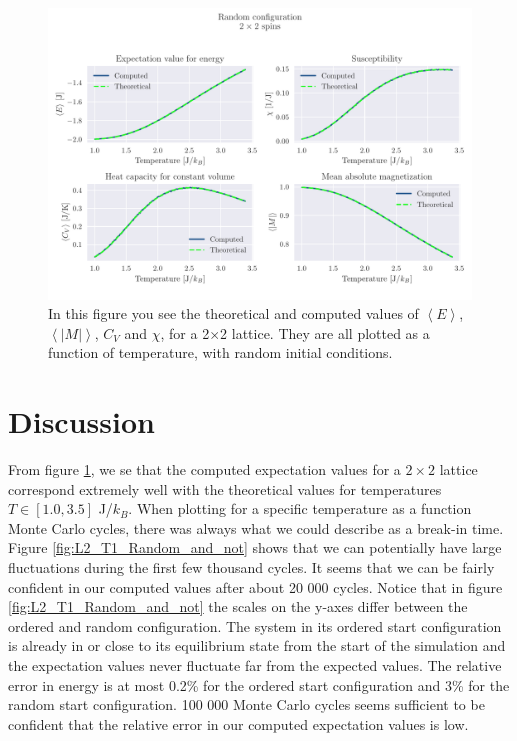 \documentclass[reprint, english,notitlepage,nofootinbib]{revtex4-1}  %
\begin{document}
\begin{figure}[!htb]
	\includegraphics[width=\linewidth]{../output/c/L2-T1-dT0_01-NT240-N6-RandomFalse-CompTemp.pdf}
	\caption{In this figure you see the theoretical and computed values of $\left<E\right>$, $\left<|M|\right>$, $C_V$ and $\chi$, for a 2$\times$2 lattice. They are all plotted as a function of temperature, with random initial conditions.}
	\label{fig:L2_Random}
\end{figure}
\section{Discussion}

From figure \ref{fig:L2_Random}, we se that the computed expectation values for a $2 \times 2$ lattice correspond extremely well with the theoretical values for temperatures $T \in [1.0, 3.5]$ J/$k_B$. When plotting for a specific temperature as a function Monte Carlo cycles, there was always what we could describe as a break-in time. Figure \ref{fig:L2_T1_Random_and_not} shows that we can potentially have large fluctuations during the first few thousand cycles. It seems that we can be fairly confident in our computed values after about 20 000 cycles. Notice that in figure \ref{fig:L2_T1_Random_and_not} the scales on the y-axes differ between the ordered and random configuration. The system in its ordered start configuration is already in or close to its equilibrium state from the start of the simulation and the expectation values never fluctuate far from the expected values. The relative error in energy is at most 0.2\% for the ordered start configuration and 3\% for the random start configuration. 100 000 Monte Carlo cycles seems sufficient to be confident that the relative error in our computed expectation values is low.
\end{document}
